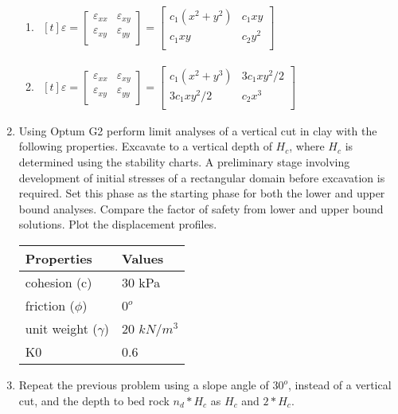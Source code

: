 \documentclass[a4paper,12pt]{article}
\begin{document}
\begin{enumerate}
	\begin{enumerate}
		\item $\!
			\begin{aligned}[t]
				\varepsilon = %
				\begin{bmatrix}
				\varepsilon_{xx} & \varepsilon_{xy} \\
				\varepsilon_{xy} & \varepsilon_{yy} \\
				\end{bmatrix} = 
				\begin{bmatrix}
				c_1(x^2 + y^2) & c_1 xy \\
				c_1 xy & c_2 y^2 \\
				\end{bmatrix}
			\end{aligned}$
		\item $\!
			\begin{aligned}[t]
				\varepsilon = %
				\begin{bmatrix}
					\varepsilon_{xx} & \varepsilon_{xy} \\
					\varepsilon_{xy} & \varepsilon_{yy} \\
				\end{bmatrix} = 
				\begin{bmatrix}
				c_1(x^2 + y^3) & 3c_1 xy^2/2 \\
				3c_1 xy^2/2 & c_2 x^3 \\
				\end{bmatrix}
			\end{aligned}$		
	\end{enumerate}
	
	\item Using Optum G2 perform limit analyses of a vertical cut in clay with the following properties. Excavate to a vertical depth of $H_c$, where $H_c$ is determined using the stability charts. A preliminary stage involving development of initial stresses of a rectangular domain before excavation is required. Set this phase as the starting phase for both the lower and upper bound analyses. Compare the factor of safety from lower and upper bound solutions. Plot the displacement profiles.
	
		\begin{table}[!h]
			\centering
			\begin{tabular}{ll}
				\toprule
				\textbf{Properties}     & \textbf{Values} \\
				\midrule
				cohesion (c) & 30 kPa    \\
				friction ($\phi$)   & $0^o$   \\
				unit weight ($\gamma$)   & 20 $kN/m^3$    \\
				K0             & 0.6  \\
				\bottomrule
			\end{tabular}
		\end{table}
	
	\item Repeat the previous problem using a slope angle of $30^o$, instead of a vertical cut, and the depth to bed rock $n_d * H_c$ as  $H_c$ and $2 * H_c$.
\end{enumerate}
\end{document}

